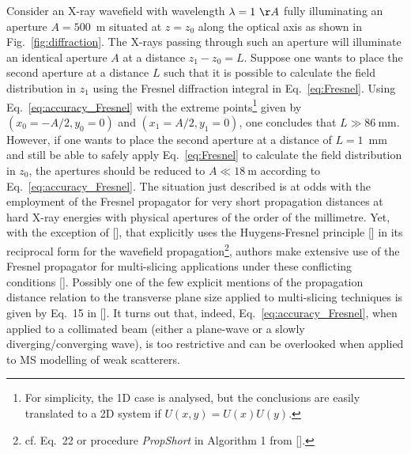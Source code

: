\begin{refsection}
Consider an X-ray wavefield with wavelength $\lambda=1~\AA$ fully illuminating an aperture $A=500$~\textmu m situated at $z=z_0$ along the optical axis as shown in Fig.~\ref{fig:diffraction}. The X-rays passing through such an aperture will illuminate an identical aperture $A$ at a distance $z_1-z_0=L$. Suppose one wants to place the second aperture at a distance $L$ such that it is possible to calculate the field distribution in $z_1$ using the Fresnel diffraction integral in Eq.~\ref{eq:Fresnel}. Using Eq.~\ref{eq:accuracy_Fresnel} with the extreme points\footnote{For simplicity, the 1D case is analysed, but the conclusions are easily translated to a 2D system if $U(x,y)=U(x)U(y)$.} given by $(x_0=-A/2, y_0=0)$ and $(x_1=A/2, y_1=0)$, one concludes that $ L\gg86~$mm. However, if one wants to place the second aperture at a distance of $L=1$~mm and still be able to safely apply Eq.~\ref{eq:Fresnel} to calculate the field distribution in $z_0$, the apertures should be reduced to $A\ll18~$\textmu m according to Eq.~\ref{eq:accuracy_Fresnel}. The situation just described is at odds with the employment of the Fresnel propagator for very short propagation distances at hard X-ray energies with physical apertures of the order of the millimetre. Yet, with the exception of [\cite{Ali2020}], that explicitly uses the Huygens-Fresnel principle [\cite[\textit{\S3.7}]{Goodman2017}] in its reciprocal form for the wavefield propagation\footnote{cf. Eq.~22 or procedure \textit{PropShort} in Algorithm 1 from [\cite{Ali2020}].}, authors make extensive use of the Fresnel propagator for multi-slicing applications under these conflicting conditions [\cite{Li2017, Munro2019, Celestre2020}]. Possibly one of the few explicit mentions of the propagation distance relation to the transverse plane size applied to multi-slicing techniques is given by Eq.~15 in [\cite{Ishizuka1977}]. It turns out that, indeed, Eq.~\ref{eq:accuracy_Fresnel}, when applied to a collimated beam (either a plane-wave or a slowly diverging/converging wave), is too restrictive and can be overlooked when applied to MS modelling of weak scatterers.


\end{refsection}
